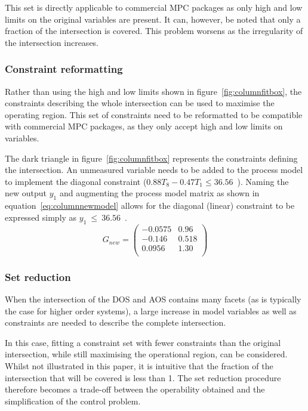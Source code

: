 \documentclass[final,authoryear,5pt,times,twocolumn]{elsarticle}
\newcommand{\bpm}{\begin{pmatrix}} %
\newcommand{\epm}{\end{pmatrix}}
\begin{document}
This set is directly applicable to commercial MPC packages as only high and low limits on the original variables are present.
It can, however, be noted that only a fraction of the intersection is covered.
This problem worsens as the irregularity of the intersection increases.

\subsubsection{Constraint reformatting}
Rather than using the high and low limits shown in figure~\ref{fig:columnfitbox}, the constraints describing the whole intersection can be used to maximise the operating region.
This set of constraints need to be reformatted to be compatible with commercial MPC packages, as they only accept high and low limits on variables.

The dark triangle in figure~\ref{fig:columnfitbox} represents the constraints defining the intersection.
An unmeasured variable needs to be added to the process model to implement the diagonal constraint ($0.88T_8-0.47T_1\leq 36.56$~\textcelsius).
Naming the new output $y_1$ and augmenting the process model matrix as shown in equation~\ref{eq:columnnewmodel} allows for the diagonal (linear) constraint to be expressed simply as {$y_1~\leq~36.56$~\textcelsius}.
\begin{equation}
  \label{eq:columnnewmodel}
  G_{new}= \bpm -0.0575 & 0.96 \\       %
                  -0.146  & 0.518 \\      %
                   0.0956 & 1.30 \\ \epm  %
\end{equation}

\subsubsection{Set reduction}
When the intersection of the DOS and AOS contains many facets (as is typically the case for higher order systems), a large increase in model variables as well as constraints are needed to describe the complete intersection.

In this case, fitting a constraint set with fewer constraints than the original intersection, while still maximising the operational region, can be considered.
Whilst not illustrated in this paper, it is intuitive that the fraction of the intersection that will be covered is less than 1.
The set reduction procedure therefore becomes a trade-off between the operability obtained and the simplification of the control problem.
\end{document}
